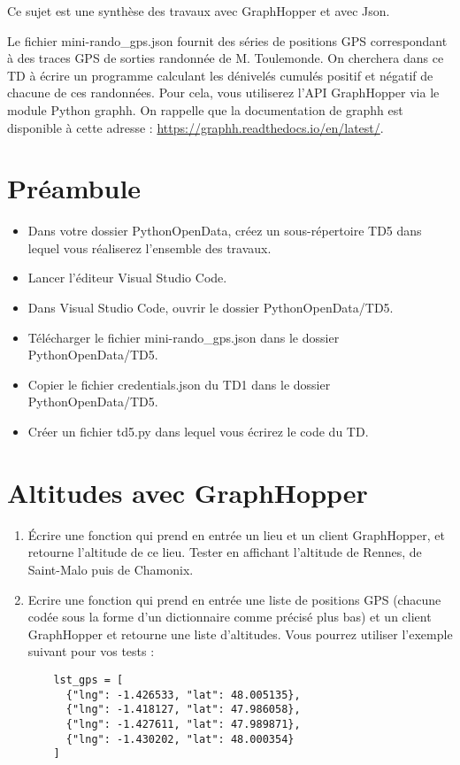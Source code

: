 \documentclass[11pt,a4paper]{article}
\begin{document}
Ce sujet est une synthèse des travaux avec GraphHopper et avec Json. 

Le fichier mini-rando\_gps.json fournit des séries de positions GPS correspondant à des traces GPS de sorties randonnée de M. Toulemonde. On cherchera dans ce TD à écrire un programme calculant les dénivelés cumulés positif et négatif de chacune de ces randonnées. Pour cela, vous utiliserez l’API GraphHopper via le module Python graphh.
On rappelle que la documentation de graphh est disponible à cette adresse : \url{https://graphh.readthedocs.io/en/latest/}.
\section*{Préambule}
\begin{itemize}
    \item Dans votre dossier PythonOpenData, créez un sous-répertoire TD5 dans lequel vous réaliserez l'ensemble des travaux.
    \item Lancer l'éditeur Visual Studio Code.
    \item Dans Visual Studio Code, ouvrir le dossier PythonOpenData/TD5. 
    \item Télécharger le fichier mini-rando\_gps.json dans le dossier PythonOpenData/TD5.
  \item Copier le fichier credentials.json du TD1 dans le dossier PythonOpenData/TD5.
  \item Créer un fichier td5.py dans lequel vous écrirez le code du TD. 
\end{itemize}

\section{Altitudes avec GraphHopper}
\begin{enumerate}
    \item Écrire une fonction qui prend en entrée un lieu et un client GraphHopper, et retourne l'altitude de ce lieu.  Tester en affichant l'altitude de Rennes, de Saint-Malo puis de Chamonix.
    \item Ecrire une fonction qui prend en entrée une liste de positions GPS (chacune codée sous la forme d’un dictionnaire comme précisé plus bas) et un client GraphHopper et retourne une liste d’altitudes. Vous pourrez utiliser l’exemple suivant pour vos tests :
\begin{verbatim}
    lst_gps = [
      {"lng": -1.426533, "lat": 48.005135},
      {"lng": -1.418127, "lat": 47.986058},
      {"lng": -1.427611, "lat": 47.989871},
      {"lng": -1.430202, "lat": 48.000354}
    ]
\end{verbatim}
\end{enumerate}
\end{document}
